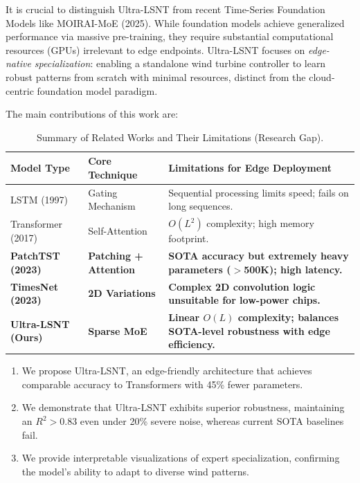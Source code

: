 \documentclass[a4paper,fleqn]{cas-sc}
\begin{document}
It is crucial to distinguish Ultra-LSNT from recent Time-Series Foundation Models like MOIRAI-MoE (2025). While foundation models achieve generalized performance via massive pre-training, they require substantial computational resources (GPUs) irrelevant to edge endpoints. Ultra-LSNT focuses on \textit{edge-native specialization}: enabling a standalone wind turbine controller to learn robust patterns from scratch with minimal resources, distinct from the cloud-centric foundation model paradigm.

The main contributions of this work are:

\begin{table}[width=\linewidth,pos=h]
\caption{Summary of Related Works and Their Limitations (Research Gap).}
\begin{tabular*}{\tblwidth}{@{} LLL @{} }
\toprule
\textbf{Model Type} & \textbf{Core Technique} & \textbf{Limitations for Edge Deployment} \\
\midrule
LSTM (1997) & Gating Mechanism & Sequential processing limits speed; fails on long sequences. \\
Transformer (2017) & Self-Attention & $O(L^2)$ complexity; high memory footprint. \\
\textbf{PatchTST (2023)} & \textbf{Patching + Attention} & \textbf{SOTA accuracy but extremely heavy parameters ($>$500K); high latency.} \\
\textbf{TimesNet (2023)} & \textbf{2D Variations} & \textbf{Complex 2D convolution logic unsuitable for low-power chips.} \\
\textbf{Ultra-LSNT (Ours)} & \textbf{Sparse MoE} & \textbf{Linear $O(L)$ complexity; balances SOTA-level robustness with edge efficiency.} \\
\bottomrule
\end{tabular*}
\label{tab:literature}
\end{table}

\begin{enumerate}
    \item We propose Ultra-LSNT, an edge-friendly architecture that achieves comparable accuracy to Transformers with 45\% fewer parameters.
    \item We demonstrate that Ultra-LSNT exhibits superior robustness, maintaining an $R^2 > 0.83$ even under 20\% severe noise, whereas current SOTA baselines fail.
    \item We provide interpretable visualizations of expert specialization, confirming the model's ability to adapt to diverse wind patterns.
\end{enumerate}
\end{document}
